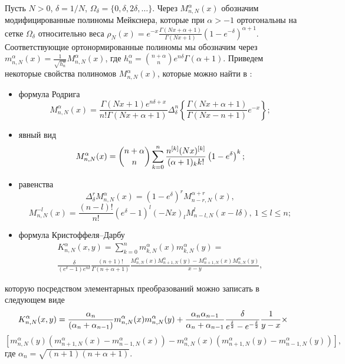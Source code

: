 Пусть $N>0$, $\delta=1/N$, $\Omega_\delta=\{0,\delta,2\delta,\ldots \}$. Через $M_{n,N}^{\alpha}(x)$ обозначим модифицированные полиномы Мейкснера, которые при $\alpha>-1$ ортогональны на сетке $\Omega_\delta$ относительно веса $\rho_N(x)=e^{-x}\frac{\Gamma(Nx+\alpha+1)}{\Gamma(Nx+1)}(1-e^{-\delta})^{\alpha+1}$. Соответствующие ортонормированные полиномы мы обозначим через $m_{n,N}^{\alpha}(x)=\frac{1}{\sqrt{h_n^\alpha}}M_{n,N}^{\alpha}(x)$, где $h_n^\alpha={n+\alpha\choose n}e^{n\delta}\Gamma(\alpha+1)$. Приведем некоторые свойства полиномов $M_{n,N}^{\alpha}(x)$, которые можно найти в \cite{Ram-SharBook}:
\begin{itemize}
\item
формула Родрига
\begin{equation}\label{Ram-for-Rod}
M_{n,N}^{\alpha}(x)=\frac{\Gamma(Nx+1)e^{n\delta+x}}{n!\Gamma(Nx+\alpha+1)}
\Delta^n_\delta\left\{\frac{\Gamma(Nx+\alpha+1)}
{\Gamma(Nx-n+1)}e^{-x}\right\};
\end{equation}
\item
явный вид
\begin{equation}\label{Ram-explicit-rep}
M_{n,N}^\alpha(x)={n+\alpha\choose n}\sum_{k=0}^n{n^{[k]}(Nx)^{[k]}\over(\alpha+1)_kk!}\left(1-e^\delta\right)^k;
\end{equation}
\item
равенства
\begin{equation}\label{Ram-deriv}
\Delta_\delta^r M_{n,N}^{\alpha}(x)=(1-e^{\delta})^rM_{n-r,N}^{\alpha+r}(x),
\end{equation}
\begin{equation}\label{Ram-parametr-r}
M^{-l}_{n,N}(x)=\frac{(n-l)!}{n!}(e^\delta-1)^l(-Nx)_lM_{n-l,N}^l(x-l\delta),\ 1\le l\le n;
\end{equation}

\item
формула Кристоффеля--Дарбу
\begin{multline}\label{Ram-Kric-Dar}
K_{n,N}^{\alpha}(x,y)=\sum_{k=0}^n m_{k,N}^{\alpha}(x)m_{k,N}^{\alpha}(y)=\\
\frac{\delta}{(e^{\delta}-1)e^{n\delta}}\frac{(n+1)!}{\Gamma(n+\alpha+1)}\frac{M_{n,N}^\alpha(x)M_{n+1,N}^\alpha(y)-
M_{n+1,N}^\alpha(x)M_{n,N}^\alpha(y)}{x-y},
\end{multline}
\end{itemize}
которую посредством элементарных преобразований можно записать в следующем виде
$$
K_{n,N}^\alpha(x,y)={\alpha_n\over(\alpha_n+\alpha_{n-1})}m_{n,N}^{\alpha}(x)m_{n,N}^{\alpha}(y)+
{\alpha_n\alpha_{n-1}\over\alpha_n+\alpha_{n-1}}{\delta\over e^{\delta\over2}-e^{-{\delta\over2}}} {1\over y-x}\times
$$
$$
\left[m_{n,N}^\alpha(y)\left(m_{n+1,N}^\alpha(x)- m_{n-1,N}^\alpha(x)\right)
-m_{n,N}^\alpha(x)\left(m_{n+1,N}^\alpha(y)-m_{n-1,N}^\alpha(y)
\right)\right],
$$
где $\alpha_n=\sqrt{(n+1)(n+\alpha+1)}$.

